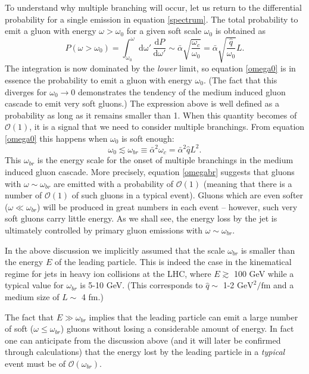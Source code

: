 \documentclass[a4paper,12pt]{article}
\numberwithin{equation}{section}
\begin{document}
To understand why multiple branching will occur, let us return to the differential probability for a single emission in equation \eqref{spectrum}. The total probability to emit a gluon with energy $\omega>\omega_0$ for a given soft scale $\omega_0$ is obtained as
\begin{equation}\label{omega0}
P(\omega>\omega_0)=\int_{\omega_0}^\omega \mathrm{d\omega'}\, \frac{\mathrm{d}P}{\mathrm{d}\omega'} \sim \bar{\alpha}\sqrt{\frac{\omega_c}{\omega_0}} = \bar{\alpha}\sqrt{\frac{\hat{q}}{\omega_0}}L.
\end{equation}
The integration is now dominated by the \emph{lower} limit, so equation \eqref{omega0} is in essence the probability to emit a gluon with energy $\omega_0$. (The fact that this diverges for $\omega_0 \rightarrow 0$ demonstrates the tendency of the medium induced gluon cascade to emit very soft gluons.) The expression above is well defined as a probability as long as it remains smaller than 1. When this quantity becomes of $\mathcal{O}(1)$, it is a signal that we need to consider multiple branchings. From equation \eqref{omega0} this happens when $\omega_0$ is soft enough: 
\begin{equation}\label{omegabr}
\omega_0 \lesssim \omega_{br} \equiv \bar{\alpha}^2\omega_c=\bar{\alpha}^2 \hat{q} L^2.
\end{equation}
This $\omega_{br}$ is the energy scale for the onset of multiple branchings in the medium induced gluon cascade. More precisely, equation \eqref{omegabr} suggests that gluons with $\omega \sim \omega_{br}$ are emitted with a probability of $\mathcal{O}(1)$ (meaning that there is a number of $\mathcal{O}(1)$ of such gluons in a typical event). Gluons which are even softer ($\omega \ll \omega_{br}$) will be produced in great numbers in each event -- however, such very soft gluons carry little energy. As we shall see, the energy loss by the jet is ultimately controlled by primary gluon emissions with $\omega \sim \omega_{br}$.



In the above discussion we implicitly assumed that the scale $\omega_{br}$ is smaller than the energy $E$ of the leading particle. This is indeed the case in the kinematical regime for jets in heavy ion collisions at the LHC, where $E\gtrsim $ 100 GeV while a typical value for $\omega_{br}$ is 5-10 GeV. (This corresponds to $\hat{q} \sim$ 1-2 $\text{GeV}^2/\text{fm}$ and a medium size of $L\sim$ 4 fm.)\cite{Review}

The fact that $E\gg \omega_{br}$ implies that the leading particle can emit a large number of soft ($\omega \leq \omega_{br}$) gluons without losing a considerable amount of energy. In fact one can anticipate from the discussion above (and it will later be confirmed through calculations) that the energy lost by the leading particle in a \emph{typical} event must be of $\mathcal{O}(\omega_{br})$.
\end{document}
